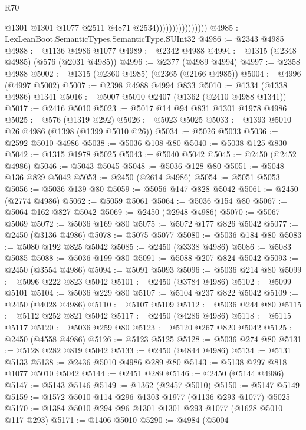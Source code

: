 \begin{lexlean}{R70}
\begin{coremodule}
                                    @1301
                                    @1301
                                    @1077
                                    @2511
                                    @4871
                                    @2534))))))))))))))))
@4985 := LexLeanBoot.SemanticTypes.SemanticType.SUInt32
@4986 := @2343 @4985
@4988 := @1136 @4986 @1077
@4989 := @2342 @4988
@4994 := @1315 (@2348 @4985) (@576 (@2031 @4985))
@4996 := @2377 (@4989 @4994)
@4997 := @2358 @4988
@5002 := @1315 (@2360 @4985) (@2365 (@2166 @4985))
@5004 := @4996 (@4997 @5002)
@5007 := @2398 @4988 @4994 @833
@5010 := @1334 (@1338 @4986) @1341
@5016 := @5007 @5010 @2407 (@1362 (@2410 @4988 @1341))
@5017 := @2416 @5010
@5023 := @5017 @14 @94 @831 @1301 @1978 @4986
@5025 := @576 (@1319 @292)
@5026 := @5023 @5025
@5033 := @1393 @5010 @26 @4986 (@1398 (@1399 @5010 @26))
@5034 := @5026 @5033
@5036 := @2592 @5010 @4986
@5038 := @5036 @108 @80
@5040 := @5038 @125 @830
@5042 := @1315 @1978 @5025
@5043 := @5040 @5042
@5045 := @2450 (@2452 @4986)
@5046 := @5043 @5045
@5048 := @5036 @128 @80
@5051 := @5048 @136 @829 @5042
@5053 := @2450 (@2614 @4986)
@5054 := @5051 @5053
@5056 := @5036 @139 @80
@5059 := @5056 @147 @828 @5042
@5061 := @2450 (@2774 @4986)
@5062 := @5059 @5061
@5064 := @5036 @154 @80
@5067 := @5064 @162 @827 @5042
@5069 := @2450 (@2948 @4986)
@5070 := @5067 @5069
@5072 := @5036 @169 @80
@5075 := @5072 @177 @826 @5042
@5077 := @2450 (@3136 @4986)
@5078 := @5075 @5077
@5080 := @5036 @184 @80
@5083 := @5080 @192 @825 @5042
@5085 := @2450 (@3338 @4986)
@5086 := @5083 @5085
@5088 := @5036 @199 @80
@5091 := @5088 @207 @824 @5042
@5093 := @2450 (@3554 @4986)
@5094 := @5091 @5093
@5096 := @5036 @214 @80
@5099 := @5096 @222 @823 @5042
@5101 := @2450 (@3784 @4986)
@5102 := @5099 @5101
@5104 := @5036 @229 @80
@5107 := @5104 @237 @822 @5042
@5109 := @2450 (@4028 @4986)
@5110 := @5107 @5109
@5112 := @5036 @244 @80
@5115 := @5112 @252 @821 @5042
@5117 := @2450 (@4286 @4986)
@5118 := @5115 @5117
@5120 := @5036 @259 @80
@5123 := @5120 @267 @820 @5042
@5125 := @2450 (@4558 @4986)
@5126 := @5123 @5125
@5128 := @5036 @274 @80
@5131 := @5128 @282 @819 @5042
@5133 := @2450 (@4844 @4986)
@5134 := @5131 @5133
@5138 := @2436 @5010 @4986 @289 @80
@5143 := @5138 @297 @818 @1077 @5010 @5042
@5144 := @2451 @289
@5146 := @2450 (@5144 @4986)
@5147 := @5143 @5146
@5149 := @1362 (@2457 @5010)
@5150 := @5147 @5149
@5159 := @1572 @5010 @114 @296 @1303 @1977 (@1136 @293 @1077) @5025
@5170 := @1384 @5010 @294 @96 @1301 @1301 @293 @1077 (@1628 @5010 @117 @293)
@5171 := @1406 @5010
@5290 := @4984
    (@5004

\end{coremodule}
\end{lexlean}

